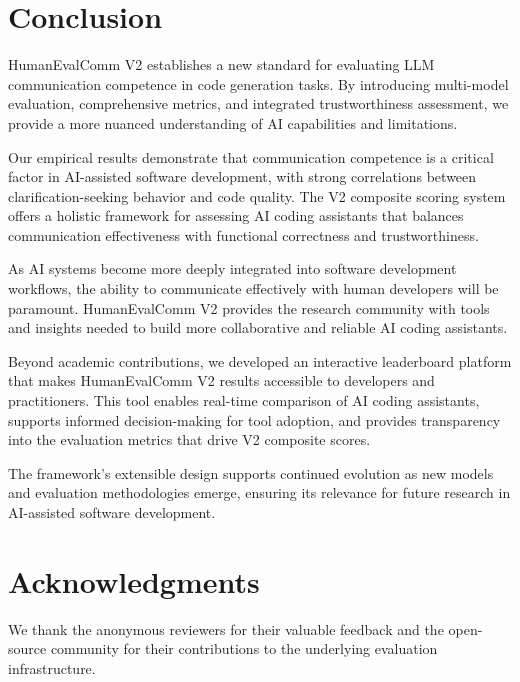 \documentclass[conference]{IEEEtran}
\begin{document}
\section{Conclusion}

HumanEvalComm V2 establishes a new standard for evaluating LLM communication competence in code generation tasks. By introducing multi-model evaluation, comprehensive metrics, and integrated trustworthiness assessment, we provide a more nuanced understanding of AI capabilities and limitations.

Our empirical results demonstrate that communication competence is a critical factor in AI-assisted software development, with strong correlations between clarification-seeking behavior and code quality. The V2 composite scoring system offers a holistic framework for assessing AI coding assistants that balances communication effectiveness with functional correctness and trustworthiness.

As AI systems become more deeply integrated into software development workflows, the ability to communicate effectively with human developers will be paramount. HumanEvalComm V2 provides the research community with tools and insights needed to build more collaborative and reliable AI coding assistants.

Beyond academic contributions, we developed an interactive leaderboard platform that makes HumanEvalComm V2 results accessible to developers and practitioners. This tool enables real-time comparison of AI coding assistants, supports informed decision-making for tool adoption, and provides transparency into the evaluation metrics that drive V2 composite scores.

The framework's extensible design supports continued evolution as new models and evaluation methodologies emerge, ensuring its relevance for future research in AI-assisted software development.

\section*{Acknowledgments}

We thank the anonymous reviewers for their valuable feedback and the open-source community for their contributions to the underlying evaluation infrastructure.



\end{document}
